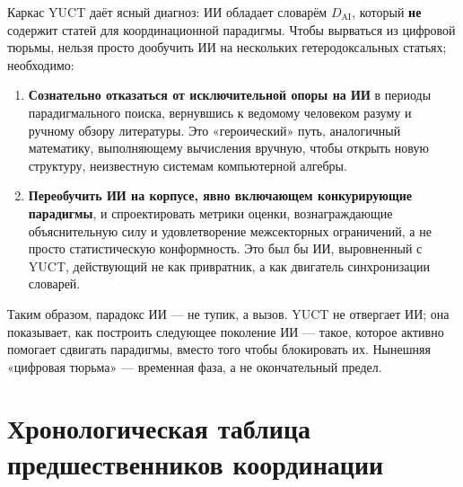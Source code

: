 \documentclass[12pt,a4paper]{article}
\begin{document}
	Каркас YUCT даёт ясный диагноз: ИИ обладает словарём \(D_{\text{AI}}\), который \textbf{не} содержит статей для координационной парадигмы. Чтобы вырваться из цифровой тюрьмы, нельзя просто дообучить ИИ на нескольких гетеродоксальных статьях; необходимо:
	
	\begin{enumerate}
		\item \textbf{Сознательно отказаться от исключительной опоры на ИИ} в периоды парадигмального поиска, вернувшись к ведомому человеком разуму и ручному обзору литературы. Это «героический» путь, аналогичный математику, выполняющему вычисления вручную, чтобы открыть новую структуру, неизвестную системам компьютерной алгебры.
		\item \textbf{Переобучить ИИ на корпусе, явно включающем конкурирующие парадигмы}, и спроектировать метрики оценки, вознаграждающие объяснительную силу и удовлетворение межсекторных ограничений, а не просто статистическую конформность. Это был бы ИИ, выровненный с YUCT, действующий не как привратник, а как двигатель синхронизации словарей.
	\end{enumerate}
	
	Таким образом, парадокс ИИ — не тупик, а вызов. YUCT не отвергает ИИ; она показывает, как построить следующее поколение ИИ — такое, которое активно помогает сдвигать парадигмы, вместо того чтобы блокировать их. Нынешняя «цифровая тюрьма» — временная фаза, а не окончательный предел.
	
	\section{Хронологическая таблица предшественников координации}
	
\end{document}
